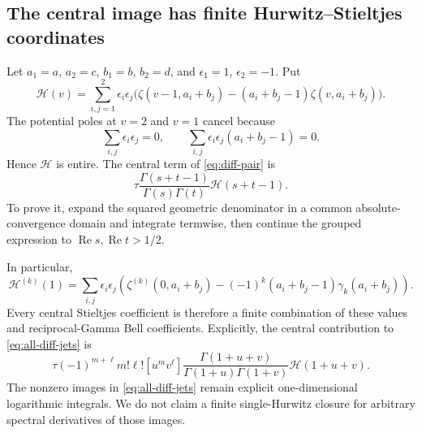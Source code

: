 \documentclass[11pt,a4paper]{article}
\numberwithin{equation}{section}
\theoremstyle{definition}
\theoremstyle{remark}
\DeclareMathOperator{\Ree}{Re}
\begin{document}
\subsection{The central image has finite Hurwitz--Stieltjes coordinates}
Let $a_1=a$, $a_2=c$, $b_1=b$, $b_2=d$, and
$\epsilon_1=1$, $\epsilon_2=-1$. Put
\begin{equation}\label{eq:Hcentral}
 \mathcal H(v)=\sum_{i,j=1}^2\epsilon_i\epsilon_j
       \bigl(\zeta(v-1,a_i+b_j)
                  -(a_i+b_j-1)\zeta(v,a_i+b_j)\bigr).
\end{equation}
The potential poles at $v=2$ and $v=1$ cancel because
\[
 \sum_{i,j}\epsilon_i\epsilon_j=0,
 \qquad \sum_{i,j}\epsilon_i\epsilon_j(a_i+b_j-1)=0.
\]
Hence $\mathcal H$ is entire. The central term of
\eqref{eq:diff-pair} is
\begin{equation}\label{eq:central-spectral}
 \tau\frac{\Gamma(s+t-1)}{\Gamma(s)\Gamma(t)}\mathcal H(s+t-1).
\end{equation}
To prove it, expand the squared geometric denominator in a common
absolute-convergence domain and integrate termwise, then continue
the grouped expression to $\Ree s,\Ree t>1/2$.

In particular,
\begin{equation}\label{eq:central-jets}
 \mathcal H^{(k)}(1)=\sum_{i,j}\epsilon_i\epsilon_j
 \left(\zeta^{(k)}(0,a_i+b_j)
       -(-1)^k(a_i+b_j-1)\gamma_k(a_i+b_j)\right).
\end{equation}
Every central Stieltjes coefficient is therefore a finite
combination of these values and reciprocal-Gamma Bell coefficients.
Explicitly, the central contribution to \eqref{eq:all-diff-jets} is
\begin{equation}\label{eq:central-coeff}
 \tau(-1)^{m+\ell}m!\ell!
 [u^m v^\ell]
 \frac{\Gamma(1+u+v)}{\Gamma(1+u)\Gamma(1+v)}
                          \mathcal H(1+u+v).
\end{equation}
The nonzero images in \eqref{eq:all-diff-jets} remain explicit
one-dimensional logarithmic integrals. We do not claim a finite
single-Hurwitz closure for arbitrary spectral derivatives of those
images.
\end{document}
